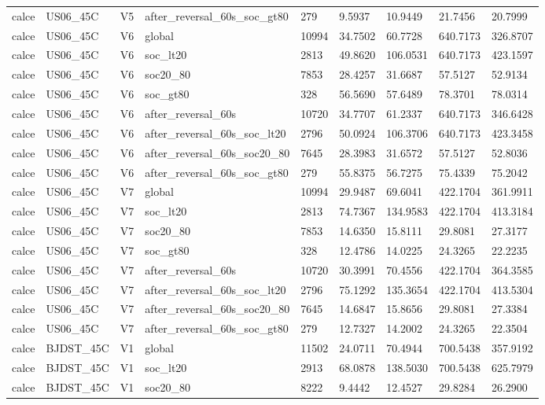 \begin{tabular}{lllllllll}
calce & US06\_45C & V5 & after\_reversal\_60s\_soc\_gt80 & 279 & 9.5937 & 10.9449 & 21.7456 & 20.7999 \\
calce & US06\_45C & V6 & global & 10994 & 34.7502 & 60.7728 & 640.7173 & 326.8707 \\
calce & US06\_45C & V6 & soc\_lt20 & 2813 & 49.8620 & 106.0531 & 640.7173 & 423.1597 \\
calce & US06\_45C & V6 & soc20\_80 & 7853 & 28.4257 & 31.6687 & 57.5127 & 52.9134 \\
calce & US06\_45C & V6 & soc\_gt80 & 328 & 56.5690 & 57.6489 & 78.3701 & 78.0314 \\
calce & US06\_45C & V6 & after\_reversal\_60s & 10720 & 34.7707 & 61.2337 & 640.7173 & 346.6428 \\
calce & US06\_45C & V6 & after\_reversal\_60s\_soc\_lt20 & 2796 & 50.0924 & 106.3706 & 640.7173 & 423.3458 \\
calce & US06\_45C & V6 & after\_reversal\_60s\_soc20\_80 & 7645 & 28.3983 & 31.6572 & 57.5127 & 52.8036 \\
calce & US06\_45C & V6 & after\_reversal\_60s\_soc\_gt80 & 279 & 55.8375 & 56.7275 & 75.4339 & 75.2042 \\
calce & US06\_45C & V7 & global & 10994 & 29.9487 & 69.6041 & 422.1704 & 361.9911 \\
calce & US06\_45C & V7 & soc\_lt20 & 2813 & 74.7367 & 134.9583 & 422.1704 & 413.3184 \\
calce & US06\_45C & V7 & soc20\_80 & 7853 & 14.6350 & 15.8111 & 29.8081 & 27.3177 \\
calce & US06\_45C & V7 & soc\_gt80 & 328 & 12.4786 & 14.0225 & 24.3265 & 22.2235 \\
calce & US06\_45C & V7 & after\_reversal\_60s & 10720 & 30.3991 & 70.4556 & 422.1704 & 364.3585 \\
calce & US06\_45C & V7 & after\_reversal\_60s\_soc\_lt20 & 2796 & 75.1292 & 135.3654 & 422.1704 & 413.5304 \\
calce & US06\_45C & V7 & after\_reversal\_60s\_soc20\_80 & 7645 & 14.6847 & 15.8656 & 29.8081 & 27.3384 \\
calce & US06\_45C & V7 & after\_reversal\_60s\_soc\_gt80 & 279 & 12.7327 & 14.2002 & 24.3265 & 22.3504 \\
calce & BJDST\_45C & V1 & global & 11502 & 24.0711 & 70.4944 & 700.5438 & 357.9192 \\
calce & BJDST\_45C & V1 & soc\_lt20 & 2913 & 68.0878 & 138.5030 & 700.5438 & 625.7979 \\
calce & BJDST\_45C & V1 & soc20\_80 & 8222 & 9.4442 & 12.4527 & 29.8284 & 26.2900 \\

\end{tabular}
